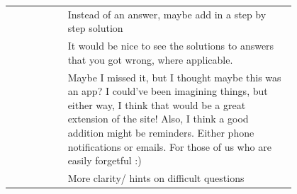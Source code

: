 \begin{longtable}{r|p{0.8\linewidth}}
		& Instead of an answer, maybe add in a step by step solution                                                                                                                                                                                                                                                                                                                                                                                                                                                                                                                                                                                                                                                                                       \\
		& It would be nice to see the solutions to answers that you got wrong, where applicable.                                                                                                                                                                                                                                                                                                                                                                                                                                                                                                                                                                                                                                                           \\
		& Maybe I missed it, but I thought maybe this was an app? I could've been imagining things, but either way, I think that would be a great extension of the site! Also, I think a good addition might be reminders. Either phone notifications or emails. For those of us who are easily forgetful :)                                                                                                                                                                                                                                                                                                                                                                                                                                               \\
		& More clarity/ hints on difficult questions                                                                                                                                                                                                                                                                                                                                                                                                                                                                                                                                                                                                                                                                                                       \\

\end{longtable}
